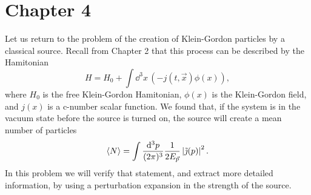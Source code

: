 \section{Chapter 4}

\setcounter{equation}{137}
\problem Let us return to the problem of the creation of Klein-Gordon particles
by a classical source. Recall from Chapter 2 that this process can be described
by the Hamitonian
\begin{equation*}
    H = H_0 + \int \dd^3 x \, \left(-j(t, \vec{x})\phi(x)\right),
\end{equation*}
where $H_0$ is the free Klein-Gordon Hamitonian, $\phi(x)$ is the Klein-Gordon 
field, and $j(x)$ is a c-number scalar function. We found that, if the system is
in the vacuum state before the source is turned on, the source will create a mean
number of particles
\begin{equation*}
    \left\langle N \right\rangle = \int \frac{\mathrm{d}^3 p}{(2\pi)^3} \frac{1}{2E_{\vec{p}}} \left| \tilde{\jmath}(p) \right|^2.
\end{equation*}
In this problem we will verify that statement, and extract more detailed information,
by using a perturbation expansion in the strength of the source.
